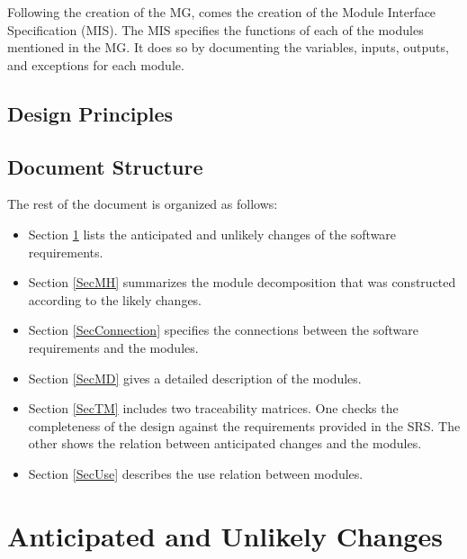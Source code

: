 \documentclass[12pt, titlepage]{article}
\begin{document}
Following the creation of the MG, comes the creation of the Module Interface Specification (MIS). The MIS specifies the functions of each of the modules mentioned in the MG. It does so by documenting the variables, inputs, outputs, and exceptions for each module. 

\subsection{Design Principles}

\subsection{Document Structure}
The rest of the document is organized as follows: 
\begin{itemize}
\item Section \ref{SecChange} lists the anticipated and unlikely changes of the software requirements.
\item Section \ref{SecMH} summarizes the module decomposition that was constructed according to the likely changes.
\item Section \ref{SecConnection} specifies the connections between the software requirements and the modules.
\item Section \ref{SecMD} gives a detailed description of the modules.
\item Section \ref{SecTM} includes two traceability matrices. One checks the completeness of the design against the requirements provided in the SRS. The other shows the relation between anticipated changes and the modules.
\item Section \ref{SecUse} describes the use relation between modules.
\end{itemize}

\section{Anticipated and Unlikely Changes} \label{SecChange}
\end{document}
